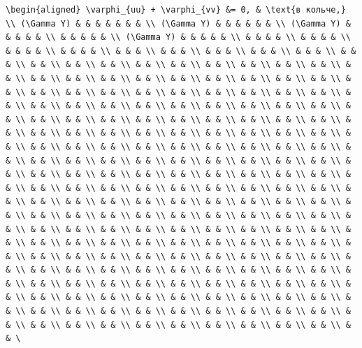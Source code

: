 \documentclass[
  ukrainian,
]{article}
\begin{document}
\begin{verbatim}
\begin{aligned} \varphi_{uu} + \varphi_{vv} &= 0, & \text{в кольче,} \\ (\Gamma Y) & & & & & & & \\ (\Gamma Y) & & & & & & \\ (\Gamma Y) & & & & & \\ & & & & & \\ (\Gamma Y) & & & & & \\ & & & & \\ & & & & \\ & & & & \\ & & & & \\ & & & \\ & & & \\ & & & \\ & & & \\ & & & \\ & & & \\ & & \\ & & \\ & & \\ & & \\ & & \\ & & \\ & & \\ & & \\ & & \\ & & \\ & & \\ & & \\ & & \\ & & \\ & & \\ & & \\ & & \\ & & \\ & & \\ & & \\ & & \\ & & \\ & & \\ & & \\ & & \\ & & \\ & & \\ & & \\ & & \\ & & \\ & & \\ & & \\ & & \\ & & \\ & & \\ & & \\ & & \\ & & \\ & & \\ & & \\ & & \\ & & \\ & & \\ & & \\ & & \\ & & \\ & & \\ & & \\ & & \\ & & \\ & & \\ & & \\ & & \\ & & \\ & & \\ & & \\ & & \\ & & \\ & & \\ & & \\ & & \\ & & \\ & & \\ & & \\ & & \\ & & \\ & & \\ & & \\ & & \\ & & \\ & & \\ & & \\ & & \\ & & \\ & & \\ & & \\ & & \\ & & \\ & & \\ & & \\ & & \\ & & \\ & & \\ & & \\ & & \\ & & \\ & & \\ & & \\ & & \\ & & \\ & & \\ & & \\ & & \\ & & \\ & & \\ & & \\ & & \\ & & \\ & & \\ & & \\ & & \\ & & \\ & & \\ & & \\ & & \\ & & \\ & & \\ & & \\ & & \\ & & \\ & & \\ & & \\ & & \\ & & \\ & & \\ & & \\ & & \\ & & \\ & & \\ & & \\ & & \\ & & \\ & & \\ & & \\ & & \\ & & \\ & & \\ & & \\ & & \\ & & \\ & & \\ & & \\ & & \\ & & \\ & & \\ & & \\ & & \\ & & \\ & & \\ & & \\ & & \\ & & \\ & & \\ & & \\ & & \\ & & \\ & & \\ & & \\ & & \\ & & \\ & & \\ & & \\ & & \\ & & \\ & & \\ & & \\ & & \\ & & \\ & & \\ & & \\ & & \\ & & \\ & & \\ & & \\ & & \\ & & \\ & & \\ & & \\ & & \\ & & \\ & & \\ & & \\ & & \\ & & \\ & & \\ & & \\ & & \\ & & \\ & & \\ & & \\ & & \\ & & \\ & & \\ & & \\ & & \\ & & \\ & & \\ & & \\ & & \\ & & \\ & & \\ & & \\ & & \\ & & \\ & & \\ & & \\ & & \\ & & \\ & & \\ & & \
\end{verbatim}
\end{document}
